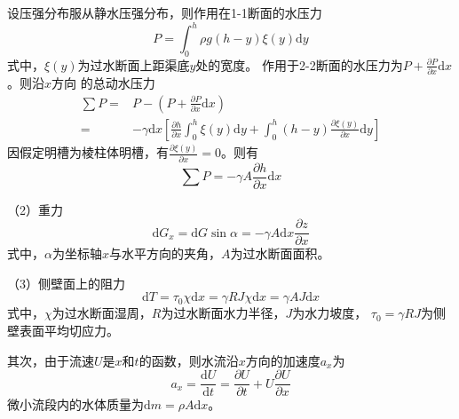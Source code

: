 设压强分布服从静水压强分布，则作用在1-1断面的水压力
\begin{equation}
  P
  =
  \int_{0}^{h}\! \rho g(h-y)\xi(y)\mathrm{d}y
\end{equation}
式中，$\xi(y)$为过水断面上距渠底$y$处的宽度。
作用于2-2断面的水压力为$P+\frac{\partial P}{\partial x}\mathrm{d}x$。则沿$x$方向
的总动水压力
\begin{equation}
  \begin{aligned}
    \sum P
    =&
    P - \left(P+\frac {\partial P} {\partial x}\mathrm{d}x\right)
    \\
    =&
    -\gamma \mathrm{d}x
    \left[
      \frac{\partial h}{\partial x}
      \int_{0}^{h}\!
      \xi(y)
      \mathrm{d}y
      +
      \int_{0}^{h}\!
      (h-y)
      \frac{\partial \xi(y)}{\partial x}
      \mathrm{d}y
    \right]
  \end{aligned}
  \label{EqCGe_SVe_Me_Pressure}
\end{equation}
因假定明槽为棱柱体明槽，有$\frac{\partial \xi(y)}{\partial x}=0$。则有
\begin{equation}
  \sum P
  =
  -\gamma A\frac{\partial h}{\partial x}\mathrm{d}x
\end{equation}

（2）重力
\begin{equation}
  \mathrm{d}G_{x}
  =
  \mathrm{d}G\sin\alpha
  =
  -\gamma A\mathrm{d}x\frac{\partial z}{\partial x}
\end{equation}
式中，$\alpha$为坐标轴$x$与水平方向的夹角，$A$为过水断面面积。

（3）侧壁面上的阻力
\begin{equation}
  \mathrm{d}T
  =
  \tau_{0}\chi\mathrm{d}x
  =
  \gamma RJ\chi\mathrm{d}x
  =
  \gamma AJ\mathrm{d}x
\end{equation}
式中，$\chi$为过水断面湿周，$R$为过水断面水力半径，$J$为水力坡度，
$\tau_{0}=\gamma RJ$为侧壁表面平均切应力。

其次，由于流速$U$是$x$和$t$的函数，则水流沿$x$方向的加速度$a_{x}$为
\begin{equation}
  a_{x}
  =
  \frac{\mathrm{d} U}{\mathrm{d} t}
  =
  \frac{\partial U}{\partial t}
  +
  U
  \frac{\partial U}{\partial x}
\end{equation}
微小流段内的水体质量为$\mathrm{d}m=\rho A\mathrm{d}x$。

